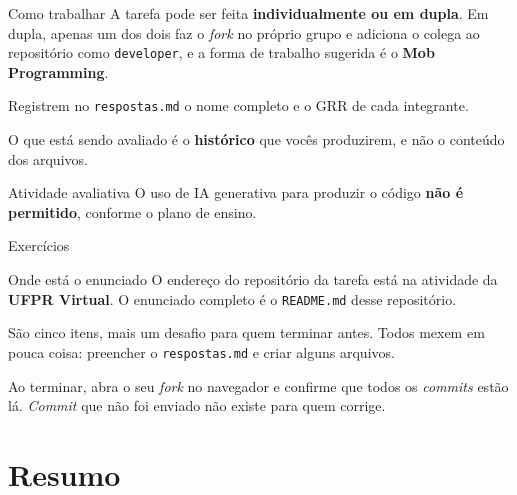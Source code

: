 \documentclass{beamer}
\begin{document}
\begin{frame}{Como trabalhar}
  A tarefa pode ser feita \textbf{individualmente ou em dupla}. Em dupla, apenas
  um dos dois faz o \textit{fork} no próprio grupo e adiciona o colega ao
  repositório como \texttt{developer}, e a forma de trabalho sugerida é o
  \textbf{Mob Programming}.

  \vspace{0.4cm}
  Registrem no \texttt{respostas.md} o nome completo e o GRR de cada integrante.

  \vspace{0.4cm}
  \begin{block}{}
    O que está sendo avaliado é o \textbf{histórico} que vocês produzirem, e não
    o conteúdo dos arquivos.
  \end{block}

  \vspace{0.3cm}
  \begin{alertblock}{Atividade avaliativa}
    O uso de IA generativa para produzir o código \textbf{não é permitido},
    conforme o plano de ensino.
  \end{alertblock}
\end{frame}

\begin{frame}{Exercícios}
  \begin{block}{Onde está o enunciado}
    O endereço do repositório da tarefa está na atividade da \textbf{UFPR
    Virtual}. O enunciado completo é o \texttt{README.md} desse repositório.
  \end{block}

  \vspace{0.4cm}
  São cinco itens, mais um desafio para quem terminar antes. Todos mexem em
  pouca coisa: preencher o \texttt{respostas.md} e criar alguns arquivos.

  \vspace{0.4cm}
  \begin{alertblock}{}
    Ao terminar, abra o seu \textit{fork} no navegador e confirme que todos os
    \textit{commits} estão lá. \textit{Commit} que não foi enviado não existe
    para quem corrige.
  \end{alertblock}
\end{frame}

\section*{Resumo}
\end{document}
